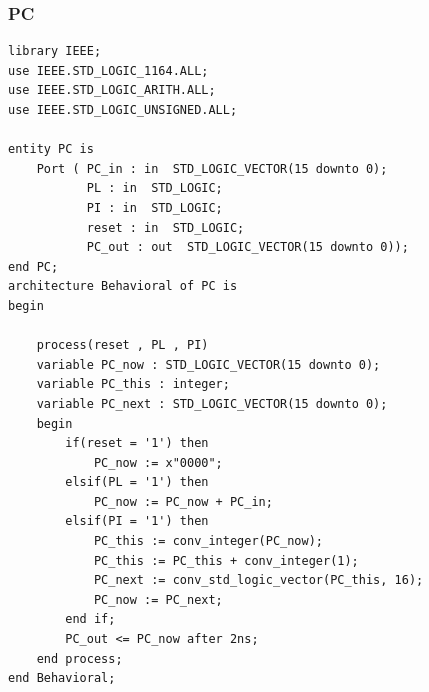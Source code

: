 \documentclass{article}
\begin{document}
\subsubsection{PC}\label{sec:intro}
\begin{lstlisting}
library IEEE;
use IEEE.STD_LOGIC_1164.ALL;
use IEEE.STD_LOGIC_ARITH.ALL;
use IEEE.STD_LOGIC_UNSIGNED.ALL;

entity PC is
    Port ( PC_in : in  STD_LOGIC_VECTOR(15 downto 0);
           PL : in  STD_LOGIC;
           PI : in  STD_LOGIC;
           reset : in  STD_LOGIC;
           PC_out : out  STD_LOGIC_VECTOR(15 downto 0));
end PC;
architecture Behavioral of PC is
begin

	process(reset , PL , PI)
	variable PC_now : STD_LOGIC_VECTOR(15 downto 0);
	variable PC_this : integer;
	variable PC_next : STD_LOGIC_VECTOR(15 downto 0);
	begin 
		if(reset = '1') then
			PC_now := x"0000";
		elsif(PL = '1') then
			PC_now := PC_now + PC_in;
		elsif(PI = '1') then
			PC_this := conv_integer(PC_now);
			PC_this := PC_this + conv_integer(1);
			PC_next := conv_std_logic_vector(PC_this, 16);
			PC_now := PC_next;
		end if;
		PC_out <= PC_now after 2ns;
	end process;
end Behavioral;
   
\end{lstlisting}
\pagebreak
\end{document}
